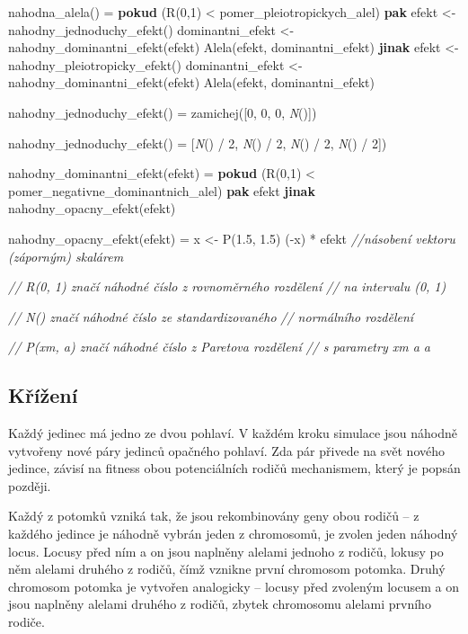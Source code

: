 \begin{tcolorbox}[ title={Pseudokód popisující generování náhodné alely}
                 , breakable
                 ]

\begin{code}[commandchars=\\\{\}]
nahodna_alela() =
    \textbf{pokud} (R(0,1) < pomer_pleiotropickych_alel)
        \textbf{pak}
            efekt <- nahodny_jednoduchy_efekt()
            dominantni_efekt <- nahodny_dominantni_efekt(efekt)
            Alela(efekt, dominantni_efekt)
        \textbf{jinak}
            efekt <- nahodny_pleiotropicky_efekt()
            dominantni_efekt <- nahodny_dominantni_efekt(efekt)
            Alela(efekt, dominantni_efekt)

nahodny_jednoduchy_efekt() =
    zamichej([0, 0, 0, \textit{N}()])

nahodny_jednoduchy_efekt() =
    [\textit{N}() / 2, \textit{N}() / 2, \textit{N}() / 2, \textit{N}() / 2])

nahodny_dominantni_efekt(efekt) =
    \textbf{pokud} (R(0,1) < pomer_negativne_dominantnich_alel)
        \textbf{pak} efekt
        \textbf{jinak} nahodny_opacny_efekt(efekt)

nahodny_opacny_efekt(efekt) =
    x <- P(1.5, 1.5)
    (-x) * efekt \textit{//násobení vektoru (záporným) skalárem}

\textit{// {R}(0, 1) značí náhodné číslo z rovnoměrného rozdělení}
\textit{//           na intervalu (0, 1)}

\textit{// {N}() značí náhodné číslo ze standardizovaného}
\textit{//       normálního rozdělení}

\textit{// {P}(xm, a) značí náhodné číslo z Paretova rozdělení}
\textit{//            s parametry xm a a}
\end{code}
\end{tcolorbox}

\subsection{Křížení}

Každý jedinec má jedno ze dvou pohlaví. V každém kroku simulace jsou náhodně vytvořeny nové páry jedinců opačného
pohlaví. Zda pár přivede na svět nového jedince, závisí na fitness obou potenciálních rodičů mechanismem, který je
popsán později.

Každý z potomků vzniká tak, že jsou rekombinovány geny obou rodičů -- z každého jedince je náhodně vybrán jeden
z chromosomů, je zvolen jeden náhodný locus. Locusy před ním a on jsou naplněny alelami jednoho z rodičů,
lokusy po něm alelami druhého z rodičů, čímž vznikne první chromosom potomka. Druhý chromosom potomka je vytvořen
analogicky -- locusy před zvoleným locusem a on jsou naplněny alelami druhého z rodičů, zbytek chromosomu alelami
prvního rodiče.

